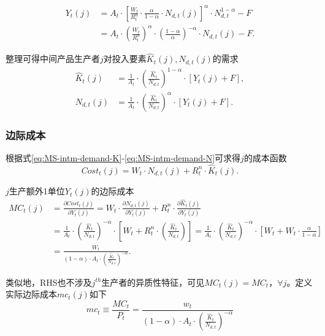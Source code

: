 \begin{align*}
Y_t(j) &= A_t \cdot \left[\frac{W_t}{R^n_t} \cdot \frac{\alpha}{1-\alpha} \cdot N_{d,t}(j)\right]^{\alpha} \cdot N_{d,t}^{1-\alpha} -F \\
&=A_t \cdot \left( \frac{W_t}{R^n_t} \right)^{\alpha} \cdot \left(\frac{1-\alpha}{\alpha}\right)^{-\alpha} \cdot N_{d,t}(j)- F.
\end{align*}

整理可得中间产品生产者$j$对投入要素$\hat{K}_t(j), N_{d,t}(j)$的需求
\begin{align}
\label{eq:MS-intm-demand-K}
\hat{K}_t(j) &= \frac{1}{A_t} \cdot \left(\frac{\hat{K}_t}{N_{d,t}}\right)^{1-\alpha} \cdot \left[Y_t(j) + F \right] , \\
\label{eq:MS-intm-demand-N}
N_{d,t}(j) &= \frac{1}{A_t} \cdot \left(\frac{\hat{K}_t}{N_{d,t}}\right)^{\alpha} \cdot \left[Y_t(j) + F \right] .
\end{align}

\subsubsection{边际成本}
根据式\eqref{eq:MS-intm-demand-K}-\eqref{eq:MS-intm-demand-N}可求得$j$的成本函数
\begin{equation}
\label{eq:MS-intm-cost-nominal}
Cost_t(j) = W_t \cdot N_{d,t}(j) + R^n_t \cdot \hat{K}_t(j).
\end{equation}

$j$生产额外1单位$Y_t(j)$的边际成本
\begin{equation}
\label{eq:MS-intm-marg-cost-nominal}
\begin{split}
MC_t(j) &= \frac{\partial Cost_t(j)}{\partial Y_t(j)}
=W_t \cdot \frac{\partial N_{d,t}(j)}{\partial Y_t(j)} + R^n_t \cdot \frac{\partial \hat{K}_t(j)}{\partial Y_t(j)} \\
&= \frac{1}{A_t} \cdot \left( \frac{\hat{K}_t}{N_{d,t}} \right)^{-\alpha} \cdot \left[
  W_t + R^n_t \cdot \left( \frac{\hat{K}_t}{N_{d,t}} \right)
\right]
= \frac{1}{A_t} \cdot \left( \frac{\hat{K}_t}{N_{d,t}} \right)^{-\alpha} \cdot \left[
  W_t + W_t \cdot \frac{\alpha}{1-\alpha}
\right] \\
&=\frac{W_t}{
  \left( 1 - \alpha \right) \cdot A_t \cdot \left( \frac{\hat{K}_t}{N_{d,t}} \right)^{-\alpha}
}.
\end{split}
\end{equation}

类似地，RHS也不涉及$j^{th}$生产者的异质性特征，可见$MC_t(j) = MC_t$，$\forall j$。定义实际边际成本$mc_t(j)$如下
\begin{equation}
\label{eq:MS-intm-marg-cost-real}
mc_t \equiv \frac{MC_t}{P_t} = \frac{w_t}{
  \left( 1 - \alpha \right) \cdot A_t \cdot \left( \frac{\hat{K}_t}{N_{d,t}} \right)^{-\alpha}}
\end{equation}

